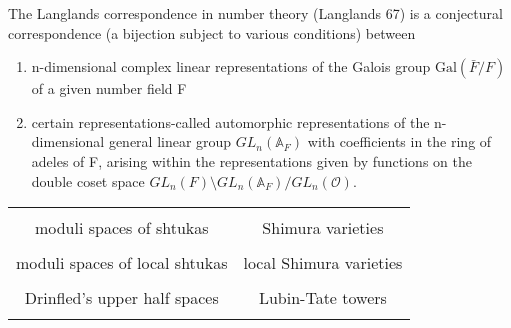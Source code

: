 \documentclass[aspectratio=1610]{ctexbeamer}
\def  \Gal      {\mathrm{Gal}}
\def  \co       {\mathcal{O}}
\begin{document}
\begin{frame}
The Langlands correspondence in number theory (Langlands 67) is a conjectural correspondence (a bijection subject to various conditions) between
\begin{enumerate}
	\item n-dimensional complex linear representations of the Galois group $\Gal(\bar{F}/F)$ of a given number field F
	\item certain representations-called automorphic representations  of the n-dimensional general linear group $GL_n(\mathbb{A}_F)$ with coefficients in the ring of adeles of F, arising within the representations given by functions on the double coset space $GL_n(F)\setminus GL_n(\mathbb{A}_F)/GL_n(\co)$.
\end{enumerate}
 \begin{table}
	
	\begin{tabular}{|c|c|}
		\hline
		
		&                               \\
		
		moduli spaces of shtukas	 &  Shimura varieties  \\
		&                              \\
		 moduli spaces of   local shtukas	 & local Shimura varieties   \\
		&                              \\
		 Drinfled's upper half spaces	        & Lubin-Tate towers  \\
		&                              \\
		\hline
	\end{tabular}
\end{table}




\end{frame}
\end{document}
